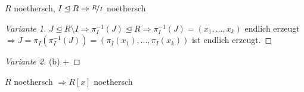\begin{conclusion}
	$R$ noethersch, $I\unlhd R\Rightarrow \lnkset{R}{I}$ noethersch
\end{conclusion}
\begin{proof}[Variante 1]
	$J\unlhd R\setminus I\Rightarrow \pi_I^{-1}(J)\unlhd R\Rightarrow\pi_I^{-1}(J)=(x_1,...,x_k)$ endlich erzeugt $\Rightarrow J=\pi_I(\pi_I^{-1}(J)) = (\pi_I(x_1),...,\pi_I(x_k))$ ist endlich erzeugt.
\end{proof}
\begin{proof}[Variante 2]
	(b) + 
\end{proof}

\begin{theorem}
	$R$ noethersch $\Rightarrow R[x]$ noethersch
\end{theorem}
